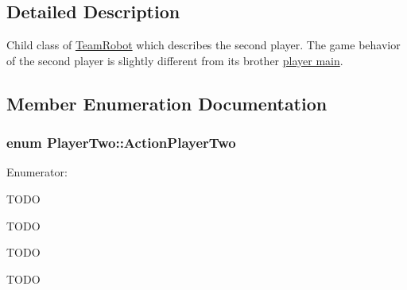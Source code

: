 \subsection{Detailed Description}
Child class of \hyperlink{classTeamRobot}{TeamRobot} which describes the second player. The game behavior of the second player is slightly different from its brother \hyperlink{classPlayerMain}{player main}. 

\subsection{Member Enumeration Documentation}
\hypertarget{classPlayerTwo_a6dd2b1afb179fe02b677dd71ec5703d2}{
\subsubsection[{ActionPlayerTwo}]{\setlength{\rightskip}{0pt plus 5cm}enum {\bf PlayerTwo::ActionPlayerTwo}}}
\label{classPlayerTwo_a6dd2b1afb179fe02b677dd71ec5703d2}
\begin{Desc}
\item[Enumerator: ]\par
\begin{description}
\item[{\em 
\hypertarget{classPlayerTwo_a6dd2b1afb179fe02b677dd71ec5703d2a1ee0927d53a79a9c07f3e8347b65ec6e}{
GO\_\-TO\_\-DEF\_\-POS}
\label{classPlayerTwo_a6dd2b1afb179fe02b677dd71ec5703d2a1ee0927d53a79a9c07f3e8347b65ec6e}
}]TODO \item[{\em 
\hypertarget{classPlayerTwo_a6dd2b1afb179fe02b677dd71ec5703d2abd5fef2f14d18f78f33c6e946f1c9cd7}{
FOLLOWPATH}
\label{classPlayerTwo_a6dd2b1afb179fe02b677dd71ec5703d2abd5fef2f14d18f78f33c6e946f1c9cd7}
}]TODO \item[{\em 
\hypertarget{classPlayerTwo_a6dd2b1afb179fe02b677dd71ec5703d2aebb0cbac0bcb8fb7439a980dcc792638}{
STOP}
\label{classPlayerTwo_a6dd2b1afb179fe02b677dd71ec5703d2aebb0cbac0bcb8fb7439a980dcc792638}
}]TODO \item[{\em 
\hypertarget{classPlayerTwo_a6dd2b1afb179fe02b677dd71ec5703d2a891b5407c8423ecb7d65df3a7da9b334}{
DEFENSE}
\label{classPlayerTwo_a6dd2b1afb179fe02b677dd71ec5703d2a891b5407c8423ecb7d65df3a7da9b334}
}]TODO \end{description}
\end{Desc}



